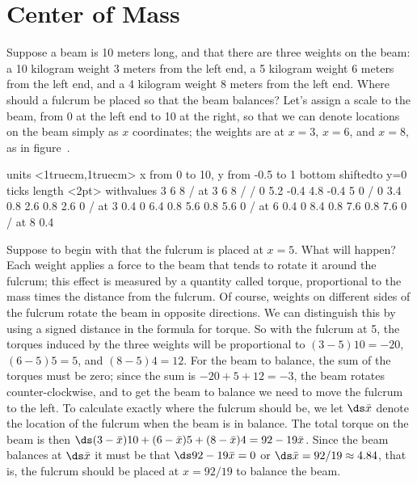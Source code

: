 \section{Center of Mass}{}{}
\label{sec:center of mass}
\nobreak
Suppose a beam is 10 meters long, and that there are three weights on
the beam: a 10 kilogram weight 3 meters from the left end, a 5
kilogram weight 6 meters from the left end, and a 4 kilogram weight 8
meters from the left end. Where should a fulcrum be placed so that the
beam balances? Let's assign a scale to the beam, from 0 at the left
end to 10 at the right, so that we can denote locations on the beam
simply as $x$ coordinates; the weights are at $x=3$, $x=6$, and $x=8$,
as in figure~.

\figure
\vbox{\beginpicture
\normalgraphs
\ninepoint
\setcoordinatesystem units <1truecm,1truecm>
\setplotarea x from 0 to 10, y from -0.5 to 1
\axis bottom shiftedto y=0 ticks length <2pt>
  withvalues {3} {6} {8} / at 3 6 8 / /
\setlinear
{} 0 5.2 -0.4 4.8 -0.4 5 0 /
 0 3.4 0.8 2.6 0.8 2.6 0 /
 at 3 0.4
 0 6.4 0.8 5.6 0.8 5.6 0 /
 at 6 0.4
 0 8.4 0.8 7.6 0.8 7.6 0 /
 at 8 0.4
\endpicture}


Suppose to begin with that the fulcrum is placed at $x=5$. What will
happen? Each weight applies a force to the beam that tends to rotate
it around the fulcrum; this effect is measured by a quantity called
{\dfont torque\/}, proportional to the mass times the
distance from the fulcrum. Of course, weights on different sides of
the fulcrum rotate the beam in opposite directions. We can distinguish
this by using a signed distance in the formula for torque. So with the
fulcrum at 5, the torques induced by the three weights will be
proportional to $(3-5)10=-20$, $(6-5)5=5$, and $(8-5)4=12$. For the
beam to balance, the sum of the torques must be zero; since the sum is
$-20+5+12=-3$, the beam rotates counter-clockwise, and to get the beam
to balance we need to move the fulcrum to the left. To calculate
exactly where the fulcrum should be, we let $\ds \bar x$ denote the
location of the fulcrum when the beam is in balance. The total torque
on the beam is then $\ds (3-\bar x)10+(6-\bar x)5+(8-\bar x)4=92-19\bar
x$. Since the beam balances at $\ds \bar x$ it must be that
$\ds 92-19\bar x=0$ or $\ds \bar x=92/19\approx 4.84$, that is, the fulcrum
should be placed at $x=92/19$ to balance the beam.

